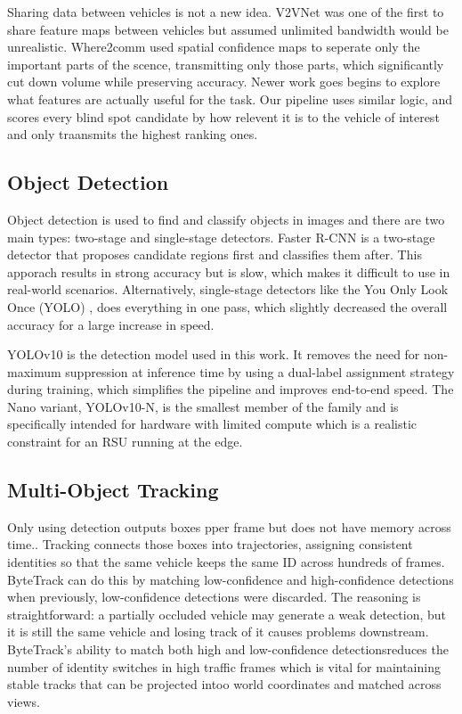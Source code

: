 \documentclass[12pt]{article}
\begin{document}
Sharing data between vehicles is not a new idea. V2VNet \cite{wang2020v2vnet} was one of the first to share feature maps between vehicles but assumed unlimited bandwidth would be unrealistic. 
\medskip
Where2comm \cite{hu2022where2comm} used spatial confidence maps to seperate only the important parts of the scence, transmitting only those parts, which significantly cut down volume while preserving accuracy.  Newer work goes begins to explore what features are actually useful for the task. Our pipeline uses similar logic, and scores every blind spot candidate by how relevent it is to the vehicle of interest and only traansmits the highest ranking ones. 

\subsection{Object Detection}

Object detection is used to find and classify objects in images and there are two main types: two-stage and single-stage detectors. Faster R-CNN \cite{ren2016faster} is a two-stage detector that proposes candidate regions first and classifies them after. This apporach results in strong accuracy but is slow, which makes it difficult to use in real-world scenarios. Alternatively, single-stage detectors like the You Only Look Once (YOLO) \cite{redmon2016yolo}, does everything in one pass, which slightly decreased the overall accuracy for a large increase in speed.

\medskip
YOLOv10 \cite{wang2024yolov10} is the detection model used in this work. It removes the need for non-maximum suppression at inference time by using a dual-label assignment strategy during training, which simplifies the pipeline and improves end-to-end speed. The Nano variant, YOLOv10-N, is the smallest member of the family and is specifically intended for hardware with limited compute which is a realistic constraint for an RSU running at the edge.

\subsection{Multi-Object Tracking}

Only using detection outputs boxes pper frame but does not have memory across time.. Tracking connects those boxes into trajectories, assigning consistent identities so that the same vehicle keeps the same ID across hundreds of frames. ByteTrack \cite{zhang2022bytetrack}  can do this by matching low-confidence and high-confidence detections when previously, low-confidence detections were discarded. The reasoning is straightforward: a partially occluded vehicle may generate a weak detection, but it is still the same vehicle and losing track of it causes problems downstream. ByteTrack's ability to match both high and low-confidence detectionsreduces the number of identity switches in high traffic frames which is vital for maintaining stable tracks that can be projected intoo world coordinates and matched across views.
\end{document}
